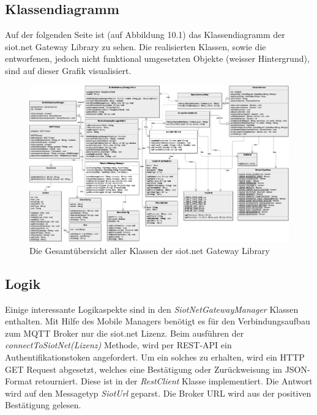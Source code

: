 \subsection{Klassendiagramm}
Auf der folgenden Seite ist (auf Abbildung 10.1) das Klassendiagramm der siot.net Gateway Library zu sehen. Die realisierten Klassen, sowie die entworfenen, jedoch nicht funktional umgesetzten Objekte (weisser Hintergrund), sind auf dieser Grafik visualisiert.
\newpage
\begin{landscape}
\begin{figure}[H]
  \centering
  \includegraphics[scale=0.1]{98_Bilder/10_Implementation/KlassendiagrammSiotNetGatewayLibrary}
  \caption[siot.net Gateway Library Klassendiagramm]{Die Gesamtübersicht aller Klassen der siot.net Gateway Library}
\end{figure}
\end{landscape}
\newpage
\subsection{Logik}
Einige interessante Logikaspekte sind in den \textit{SiotNetGatewayManager} Klassen enthalten. Mit Hilfe des Mobile Managers benötigt es für den Verbindungsaufbau zum \gls{MQTT} Broker nur die siot.net Lizenz. Beim ausführen der \textit{connectToSiotNet(Lizenz)} Methode, wird per \gls{REST}-\gls{API} ein Authentifikationstoken angefordert. Um ein solches zu erhalten, wird ein \gls{HTTP} GET Request abgesetzt, welches eine Bestätigung oder Zurückweisung im \gls{JSON}-Format retourniert. Diese ist in der \textit{RestClient} Klasse implementiert. Die Antwort wird auf den Messagetyp \textit{SiotUrl} geparst. Die Broker URL wird aus der positiven Bestätigung gelesen.

